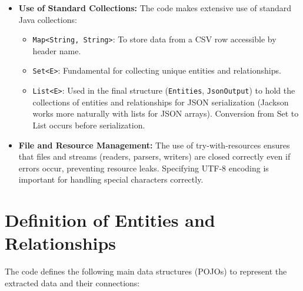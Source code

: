 \documentclass[11pt, a4paper]{article}
\begin{document}
\begin{itemize}
    \item \textbf{Use of Standard Collections:} The code makes extensive use of standard Java collections:
        \begin{itemize}
            \item \texttt{Map<String, String>}: To store data from a CSV row accessible by header name.
            \item \texttt{Set<E>}: Fundamental for collecting unique entities and relationships.
            \item \texttt{List<E>}: Used in the final structure (\texttt{Entities}, \texttt{JsonOutput}) to hold the collections of entities and relationships for JSON serialization (Jackson works more naturally with lists for JSON arrays). Conversion from Set to List occurs before serialization.
        \end{itemize}

    \item \textbf{File and Resource Management:} The use of try-with-resources ensures that files and streams (readers, parsers, writers) are closed correctly even if errors occur, preventing resource leaks. Specifying UTF-8 encoding is important for handling special characters correctly.
\end{itemize}

\section{Definition of Entities and Relationships}
The code defines the following main data structures (POJOs) to represent the extracted data and their connections:
\end{document}
